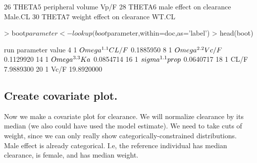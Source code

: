 \begin{Schunk}
\begin{Soutput}
26    THETA5                             peripheral volume                Vp/F
28    THETA6                      male effect on clearance             Male.CL
30    THETA7                    weight effect on clearance               WT.CL
\end{Soutput}
\begin{Sinput}
> boot$parameter <- lookup(boot$parameter,within=doc,as='label')
> head(boot)
\end{Sinput}
\begin{Soutput}
   run           parameter      value
4    1 $\\Omega^{1.1}CL/F$  0.1885950
8    1 $\\Omega^{2.2}Vc/F$  0.1129920
14   1   $\\Omega^{3.3}Ka$  0.0854714
16   1 $\\sigma^{1.1}prop$  0.0640717
18   1                CL/F  7.9889300
20   1                Vc/F 19.8920000
\end{Soutput}
\end{Schunk}
\subsection{Create covariate plot.}
Now we make a covariate plot for clearance.  We will normalize clearance 
by its median (we also could have used the model estimate).  We need to take 
cuts of weight, since we can only really show categorically-constrained distributions.
Male effect is already categorical.  I.e, the reference individual has median
clearance, is female, and has median weight.
